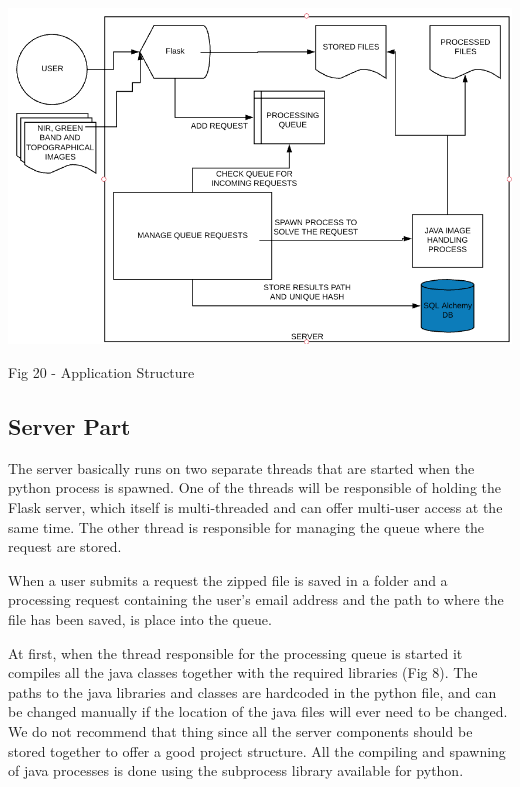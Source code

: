 \documentclass[12pt, a4paper]{report}
\begin{document}
\medskip
\includegraphics[scale=0.795, right]{application_overview.png}
\begin{center}
Fig 20 - Application Structure 
\end{center}
\par 

\subsection{Server Part}

\quad 
The server basically runs on two separate threads that are started when the python process is spawned. One of the threads will be responsible of holding the Flask server, which itself is multi-threaded and can offer multi-user access at the same time. The other thread is responsible for managing the queue where the request are stored.
\par 

When a user submits a request the zipped file is saved in a folder and a processing request containing the user's email address and the path to where the file has been saved, is place into the queue. 
\par 

At first, when the thread responsible for the processing queue is started it compiles all the java classes together with the required libraries (Fig 8). The paths to the java libraries and classes are hardcoded in the python file, and can be changed manually if the location of the java files will ever need to be changed. We do not recommend that thing since all the server components should be stored together to offer a good project structure. All the compiling and spawning of java processes is done using the subprocess library available for python. 
\par 
\end{document}
